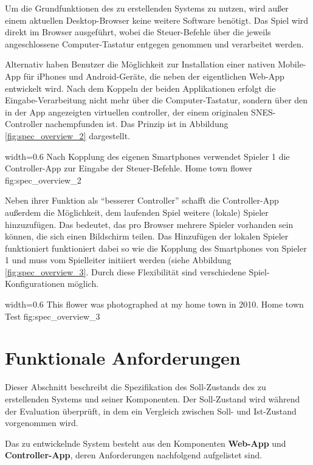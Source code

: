Um die Grundfunktionen des zu erstellenden Systems zu nutzen, wird außer
einem aktuellen Desktop-Browser keine weitere Software benötigt. Das
Spiel wird direkt im Browser ausgeführt, wobei die Steuer-Befehle über
die jeweils angeschlossene Computer-Tastatur entgegen genommen und
verarbeitet werden.

Alternativ haben Benutzer die Möglichkeit zur Installation einer nativen
Mobile-App für iPhones und Android-Geräte, die neben der eigentlichen
Web-App entwickelt wird. Nach dem Koppeln der beiden Applikationen
erfolgt die Eingabe-Verarbeitung nicht mehr über die Computer-Tastatur,
sondern über den in der App angezeigten virtuellen \gls{controller}, der
einem originalen SNES-Controller nachempfunden ist. Das Prinzip ist in
Abbildung \ref{fig:spec_overview_2} dargestellt.

   {width=0.6\textwidth}
   {Nach Kopplung des eigenen Smartphones verwendet Spieler 1 die Controller-App zur Eingabe der Steuer-Befehle.}
   {Home town flower}
   {fig:spec_overview_2}

Neben ihrer Funktion als ``besserer Controller'' schafft die
Controller-App außerdem die Möglichkeit, dem laufenden Spiel weitere
(lokale) Spieler hinzuzufügen. Das bedeutet, das pro Browser mehrere
Spieler vorhanden sein können, die sich einen Bildschirm teilen. Das
Hinzufügen der lokalen Spieler funktioniert funktioniert dabei so wie
die Kopplung des Smartphones von Spieler 1 und muss vom Spielleiter
initiiert werden (siehe Abbildung \ref{fig:spec_overview_3}. Durch diese
Flexibilität sind verschiedene Spiel-Konfigurationen möglich.

   {width=0.6\textwidth}
   {This flower was photographed at my home town in 2010.}
   {Home town Test}
   {fig:spec_overview_3}

\section{Funktionale Anforderungen}\label{funktionale-anforderungen}

Dieser Abschnitt beschreibt die Spezifikation des Soll-Zustands des zu
erstellenden Systems und seiner Komponenten. Der Soll-Zustand wird
während der Evaluation überprüft, in dem ein Vergleich zwischen Soll-
und Ist-Zustand vorgenommen wird.

Das zu entwickelnde System besteht aus den Komponenten \textbf{Web-App}
und \textbf{Controller-App}, deren Anforderungen nachfolgend aufgelistet
sind.

